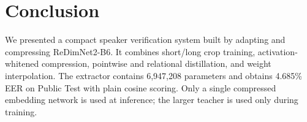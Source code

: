 \documentclass[11pt]{article}
\begin{document}
\section{Conclusion}
We presented a compact speaker verification system built by adapting and compressing ReDimNet2-B6. It combines short/long crop training, activation-whitened compression, pointwise and relational distillation, and weight interpolation. The extractor contains 6,947,208 parameters and obtains 4.685\% EER on Public Test with plain cosine scoring. Only a single compressed embedding network is used at inference; the larger teacher is used only during training.



\end{document}
